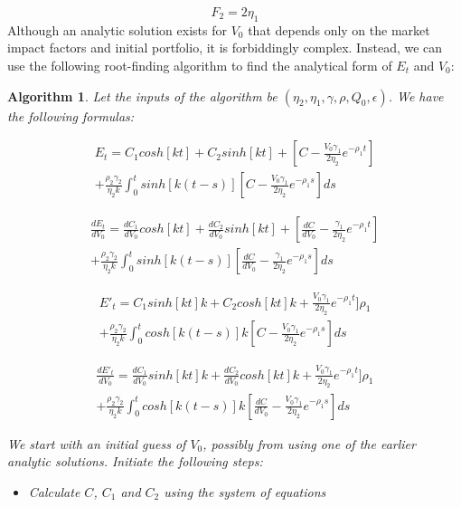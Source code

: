 \documentclass{article}
\newtheorem{algorithm}{Algorithm}
\begin{document}
\[
F_2 = 2 \eta_1
\]
Although an analytic solution exists for $V_0$ that depends only on the market impact factors and initial portfolio, it is forbiddingly complex. Instead, we can use the following root-finding algorithm to find the analytical form of $E_t$ and $V_0$:
\begin{algorithm}
Let the inputs of the algorithm be $(\eta_2,\eta_1,\gamma,\rho,Q_0,\epsilon)$. We have the following formulas:

\[
\begin{split}
E_t = C_1 cosh[k t]+ C_2  sinh[k t] + [C- \frac{V_0 \gamma_1}{2 \eta_2} e^{-\rho_1 t}] \\
+ \frac{\rho_2 \gamma_2}{\eta_2 k}\int_0^t sinh[k(t-s)] [C- \frac{V_0 \gamma_1}{2 \eta_2} e^{-\rho_1 s}]ds
\end{split}
\]

\[
\begin{aligned}
\frac{dE_t}{dV_0} = \frac{dC_1}{dV_0} cosh[k t]+ \frac{dC_2}{dV_0}  sinh[k t] + [\frac{dC}{dV_0} - \frac{\gamma_1}{2 \eta_2} e^{-\rho_1 t}] \\
+ \frac{\rho_2 \gamma_2}{\eta_2 k}\int_0^t sinh[k(t-s)] [\frac{dC}{dV_0}- \frac{\gamma_1}{2 \eta_2} e^{-\rho_1 s}]ds
\end{aligned}
\]

\[
\begin{split}
E'_t = C_1 sinh[k t] k+ C_2 cosh[k t] k + \frac{V_0 \gamma_1}{2 \eta_2} e^{-\rho_1 t}] \rho_1 \\
+ \frac{\rho_2 \gamma_2}{\eta_2 k}\int_0^t cosh[k(t-s)] k [C- \frac{V_0 \gamma_1}{2 \eta_2} e^{-\rho_1 s}]ds
\end{split}
\]


\[
\begin{split}
\frac{dE'_t}{dV_0}  = \frac{dC_1}{dV_0} sinh[k t] k + \frac{dC_2}{dV_0} cosh[k t] k + \frac{V_0 \gamma_1}{2 \eta_2} e^{-\rho_1 t}] \rho_1 \\
+ \frac{\rho_2 \gamma_2}{\eta_2 k}\int_0^t cosh[k(t-s)] k [ \frac{dC}{dV_0} - \frac{V_0 \gamma_1}{2 \eta_2} e^{-\rho_1 s}]ds
\end{split}
\]

We start with an initial guess of $V_0$, possibly from using one of the earlier analytic solutions. Initiate the following steps: \\
\begin{itemize}
\item Calculate $C$, $C_1$ and $C_2$ using the system of equations 


\end{itemize}
\end{algorithm}
\end{document}
